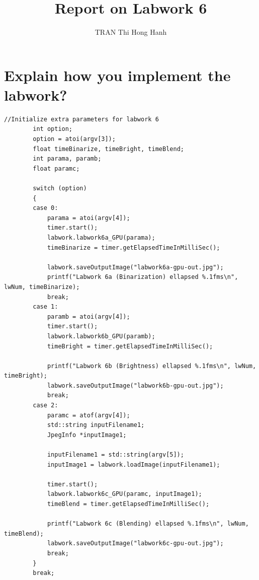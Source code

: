\documentclass{article}
\title{Report on Labwork 6}
\author{TRAN Thi Hong Hanh}
\begin{document}
\maketitle
\section{Explain how you implement the labwork?}
\begin{verbatim}
//Initialize extra parameters for labwork 6
        int option;
        option = atoi(argv[3]);
        float timeBinarize, timeBright, timeBlend;
        int parama, paramb;
        float paramc;

        switch (option)
        {
        case 0:
            parama = atoi(argv[4]);
            timer.start();
            labwork.labwork6a_GPU(parama);
            timeBinarize = timer.getElapsedTimeInMilliSec();

            labwork.saveOutputImage("labwork6a-gpu-out.jpg");
            printf("Labwork 6a (Binarization) ellapsed %.1fms\n", lwNum, timeBinarize);
            break;
        case 1:
            paramb = atoi(argv[4]);
            timer.start();
            labwork.labwork6b_GPU(paramb);
            timeBright = timer.getElapsedTimeInMilliSec();

            printf("Labwork 6b (Brightness) ellapsed %.1fms\n", lwNum, timeBright);
            labwork.saveOutputImage("labwork6b-gpu-out.jpg");
            break;
        case 2:
            paramc = atof(argv[4]);
            std::string inputFilename1;
            JpegInfo *inputImage1;

            inputFilename1 = std::string(argv[5]);
            inputImage1 = labwork.loadImage(inputFilename1);

            timer.start();
            labwork.labwork6c_GPU(paramc, inputImage1);
            timeBlend = timer.getElapsedTimeInMilliSec();

            printf("Labwork 6c (Blending) ellapsed %.1fms\n", lwNum, timeBlend);
            labwork.saveOutputImage("labwork6c-gpu-out.jpg");
            break;
        }
        break;
\end{verbatim}
\end{document}
